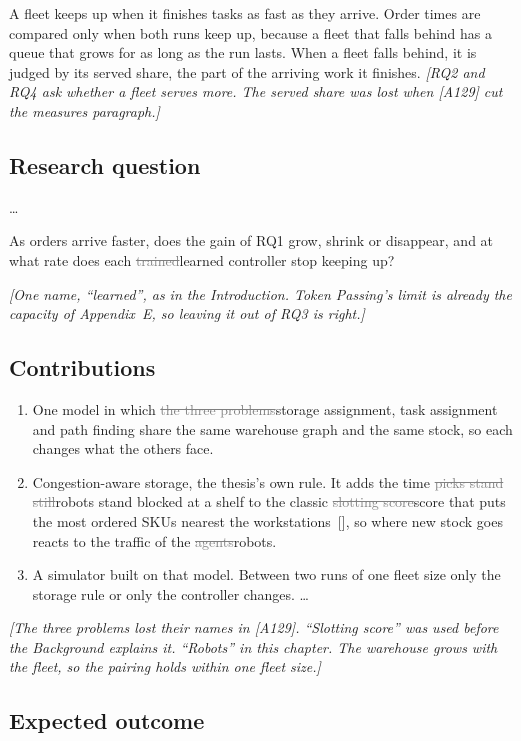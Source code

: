 \documentclass[11pt,a4paper]{article}
\newcommand{\new}[1]{\textcolor{newc}{#1}}
\newcommand{\old}[1]{\textcolor{gray}{\sout{#1}}}
\newcommand{\note}[1]{{\small\itshape [#1]}}
\newcommand{\lab}[1]{\textsf{\footnotesize\detokenize{#1}}}
\newcommand{\citep}[1]{[\lab{#1}]}
\begin{document}
A fleet keeps up when it finishes tasks as fast as they arrive. Order times
are compared only when both runs keep up, because a fleet that falls behind
has a queue that grows for as long as the run lasts. \new{When a fleet falls
behind, it is judged by its served share, the part of the arriving work it
finishes.}
\note{RQ2 and RQ4 ask whether a fleet serves more. The served share was lost
when [A129] cut the measures paragraph.}

\subsection*{Research question}
\ldots
\begin{description}[nosep]
  \item[RQ3:] As orders arrive faster, does the gain of RQ1 grow, shrink or
  disappear, and at what rate does each \old{trained}\new{learned}
  controller stop keeping up?
\end{description}
\note{One name, ``learned'', as in the Introduction. Token Passing's limit
is already the capacity of Appendix~E, so leaving it out of RQ3 is right.}

\subsection*{Contributions}
\begin{enumerate}[nosep]
\item One model in which \old{the three problems}\new{storage assignment,
  task assignment and path finding} share the same warehouse graph and the
  same stock, so each changes what the others face.
\item Congestion-aware storage, the thesis's own rule. It adds the time
  \old{picks stand still}\new{robots stand blocked} at a shelf to the classic
  \old{slotting score}\new{score that puts the most ordered SKUs nearest the
  workstations~\citep{heskett1963coi}}, so where new stock goes reacts to
  the traffic of the \old{agents}\new{robots}.
\item A simulator built on that model. Between two runs \new{of one fleet
  size} only the storage rule or only the controller changes. \ldots
\end{enumerate}
\note{The three problems lost their names in [A129]. ``Slotting score'' was
used before the Background explains it. ``Robots'' in this chapter. The
warehouse grows with the fleet, so the pairing holds within one fleet size.}

\subsection*{Expected outcome}
\end{document}
